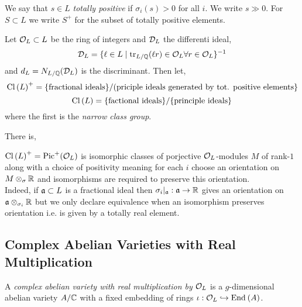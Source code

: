 \documentclass[12pt]{article}
\begin{document}
\begin{defn}
We say that $s \in L$ \textit{totally positive} if $\sigma_i(s) > 0$ for all $i$. We write $s \gg 0$. For $S \subset L$ we write $S^+$ for the subset of totally positive elements.
\end{defn}

\begin{defn}
Let $\mathcal{O}_L \subset L$ be the ring of integers and $\mathcal{D}_L$ the differenti ideal,
\[ \mathcal{D}_L = \{ \ell \in L \mid \operatorname{\mathrm{tr}}_{L/\mathbb{Q}} (\ell r) \in \mathcal{O}_L \forall r \in \mathcal{O}_L \}^{-1} \]
and $d_L = N_{L/\mathbb{Q}}(\mathcal{D}_L)$ is the discriminant. Then let,
\[ \mathrm{Cl} \left( L \right)^+ = \{ \text{fractional ideals} \} / (\text{priciple ideals generated by tot. positive elements} \} \]
\[ \mathrm{Cl} \left( L \right) = \{ \text{factional ideals} \} / \{ \text{principle ideals} \} \]
where the first is the \textit{narrow class group}. 
\end{defn}

There is,
\begin{center}
\end{center}

\begin{rmk}
$\mathrm{Cl} \left( L \right)^+ = \mathrm{Pic}^+(\mathcal{O}_L)$ is isomorphic classes of porjective $\mathcal{O}_L$-modules $M$ of rank-$1$ along with a choice of positivity meaning for each $i$ choose an orientation on $M \otimes_{\sigma} \mathbb{R}$ and isomorphisms are required to preserve this orientation. 
\bigskip\\
Indeed, if $\mathfrak{a} \subset L$ is a fractional ideal then $\sigma_i |_{\mathfrak{a}} : \mathfrak{a} \to \mathbb{R}$ gives an orientation on $\mathfrak{a} \otimes_{\sigma_i} \mathbb{R}$ but we only declare equivalence when an isomorphism preserves orientation i.e. is given by a totally real element. 
\end{rmk}

\subsection{Complex Abelian Varieties with Real Multiplication}

\begin{defn}
A \textit{complex abelian variety with real multiplication by} $\mathcal{O}_L$ is a $g$-dimensional abelian variety $A / \mathbb{C}$ with a fixed embedding of rings $\iota : \mathcal{O}_L \hookrightarrow \mathrm{End}_{} \left( A \right)$.
\end{defn}
\end{document}
